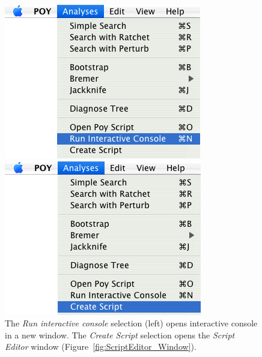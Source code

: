 \begin{figure}
\centering
\begin{minipage}[c]{0.48\textwidth}
   		\includegraphics[width=\textwidth]{figures/runinteractive_menu.jpg}
\end{minipage}
\quad
\begin{minipage}[c]{0.48\textwidth}
	   	\includegraphics[width=\textwidth]{figures/create_script_window.jpg}
   	\end{minipage}
\caption{The \emph{Run interactive console} selection (left) opens \poy interactive console in a new window. The \emph{Create Script} selection opens the \emph{Script Editor} window (Figure~\ref{fig:ScriptEditor_Window}).}
\label{fig:runinteractive}
\end{figure}


